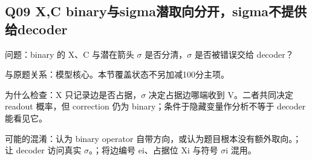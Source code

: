 \documentclass[11pt,a4paper]{article}
\begin{document}
\clearpage
\subsection{Q09 X,C binary与sigma潜取向分开，sigma不提供给decoder}
\label{aspect:Q09}
问题：binary 的 X、C 与潜在箭头 \ensuremath{\sigma} 是否分清，\ensuremath{\sigma} 是否被错误交给 decoder？

与原题关系：模型核心。本节覆盖状态不另加减100分主项。

为什么检查：X 只记录边是否占据，\ensuremath{\sigma} 决定占据边哪端收到 V。二者共同决定 readout 概率，但 correction 仍为 binary；条件于隐藏变量作分析不等于 decoder 能看见它。

可能的混淆：认为 binary operator 自带方向，或认为题目根本没有额外取向。；让 decoder 访问真实 \ensuremath{\sigma}。；将边编号 ei、占据位 Xi 与符号 \ensuremath{\sigma}i 混用。
\end{document}
